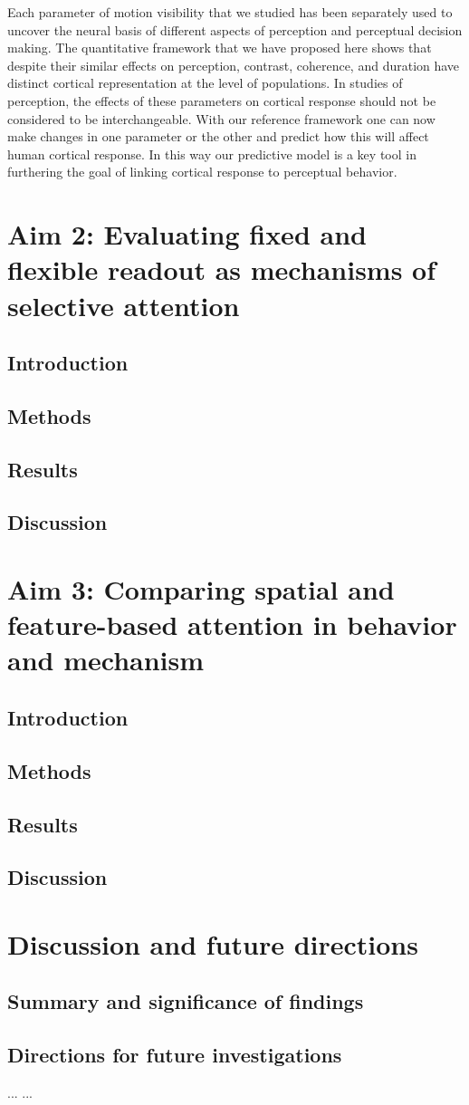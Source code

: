\documentclass{report}
\begin{document}
Each parameter of motion visibility that we studied has been separately used to uncover the neural basis of different aspects of perception and perceptual decision making. The quantitative framework that we have proposed here shows that despite their similar effects on perception, contrast, coherence, and duration have distinct cortical representation at the level of populations. In studies of perception, the effects of these parameters on cortical response should not be considered to be interchangeable. With our reference framework one can now make changes in one parameter or the other and predict how this will affect human cortical response. In this way our predictive model is a key tool in furthering the goal of linking cortical response to perceptual behavior.

\chapter{Aim 2: Evaluating fixed and flexible readout as mechanisms of selective attention}
\section{Introduction}
\section{Methods}
\section{Results}
\section{Discussion}

\chapter{Aim 3: Comparing spatial and feature-based attention in behavior and mechanism}
\section{Introduction}
\section{Methods}
\section{Results}
\section{Discussion}

\chapter{Discussion and future directions}
\section{Summary and significance of findings}
\section{Directions for future investigations}
...
\appendix
...


\end{document}

